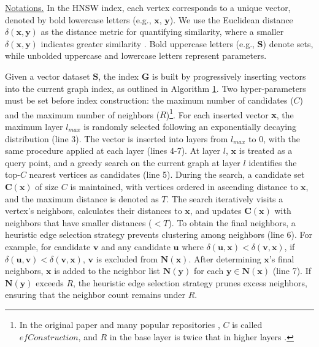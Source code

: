 \noindent\underline{Notations.} In the HNSW index, each vertex corresponds to a unique vector, denoted by bold lowercase letters (e.g., $\boldsymbol{x}$, $\boldsymbol{y}$). We use the Euclidean distance $\delta(\boldsymbol{x}, \boldsymbol{y})$ as the distance metric for quantifying similarity, where a smaller $\delta(\boldsymbol{x}, \boldsymbol{y})$ indicates greater similarity \cite{NSG,graph_survey_vldb2021,zhao2023towards,tau-MG}. Bold uppercase letters (e.g., $\boldsymbol{S}$) denote sets, while unbolded uppercase and lowercase letters represent parameters.

Given a vector dataset $\boldsymbol{S}$, the  index $\boldsymbol{G}$ is built by progressively inserting vectors into the current graph index, as outlined in Algorithm \hyperref[alg: hnsw construction]{1}. Two hyper-parameters must be set before index construction: the maximum number of candidates ($C$) and the maximum number of neighbors ($R$)\footnote{In the original paper and many popular repositories \cite{n2,hnswlib,HNSW}, $C$ is called $efConstruction$, and $R$ in the base layer is twice that in higher layers \cite{HNSW}.}. For each inserted vector $\boldsymbol{x}$, the maximum layer $l_{max}$ is randomly selected following an exponentially decaying distribution (line 3). The vector is inserted into layers from $l_{max}$ to $0$, with the same procedure applied at each layer (lines 4-7). At layer $l$, $\boldsymbol{x}$ is treated as a query point, and a greedy search on the current graph at layer $l$ identifies the top-$C$ nearest vertices as candidates (line 5). During the search, a candidate set $\boldsymbol{C(x)}$ of size $C$ is maintained, with vertices ordered in ascending distance to $\boldsymbol{x}$, and the maximum distance is denoted as $T$. The search iteratively visits a vertex's neighbors, calculates their distances to $\boldsymbol{x}$, and updates $\boldsymbol{C(x)}$ with neighbors that have smaller distances ($<T$). To obtain the final neighbors, a heuristic edge selection strategy prevents clustering among neighbors (line 6). For example, for candidate $\boldsymbol{v}$ and any candidate $\boldsymbol{u}$ where $\delta(\boldsymbol{u},\boldsymbol{x}) < \delta(\boldsymbol{v},\boldsymbol{x})$, if $\delta(\boldsymbol{u},\boldsymbol{v}) < \delta(\boldsymbol{v},\boldsymbol{x})$, $\boldsymbol{v}$ is excluded from $\boldsymbol{N(x)}$. After determining $\boldsymbol{x}$'s final neighbors, $\boldsymbol{x}$ is added to the neighbor list $\boldsymbol{N(y)}$ for each $\boldsymbol{y} \in \boldsymbol{N(x)}$ (line 7). If $\boldsymbol{N(y)}$ exceeds $R$, the heuristic edge selection strategy prunes excess neighbors, ensuring that the neighbor count remains under $R$.

